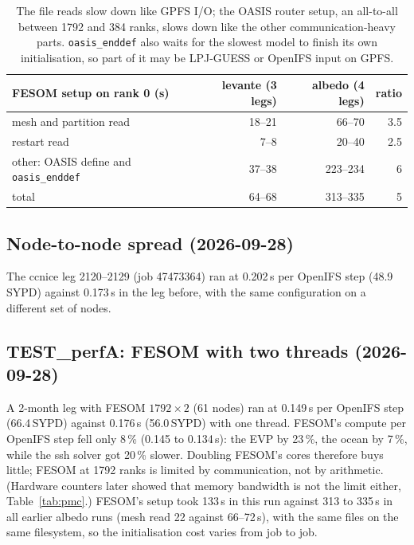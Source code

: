 \documentclass[11pt,a4paper]{article}
\begin{document}
\begin{table}[H]\centering\small
\begin{tabular}{lrrr}\toprule
FESOM setup on rank 0 (s) & levante (3 legs) & albedo (4 legs) & ratio\\\midrule
mesh and partition read & 18--21 & 66--70 & 3.5\\
restart read & 7--8 & 20--40 & 2.5\\
other: OASIS define and \texttt{oasis\_enddef} & 37--38 & 223--234 & 6\\
total & 64--68 & 313--335 & 5\\\bottomrule
\end{tabular}
\caption{The file reads slow down like GPFS I/O; the OASIS router setup, an all-to-all between 1792 and 384 ranks, slows down like the other communication-heavy parts. \texttt{oasis\_enddef} also waits for the slowest model to finish its own initialisation, so part of it may be LPJ-GUESS or OpenIFS input on GPFS.}
\end{table}

\subsection{Node-to-node spread (2026-09-28)}
The ccnice leg 2120--2129 (job 47473364) ran at 0.202\,s per OpenIFS step (48.9\,SYPD) against 0.173\,s in the leg before, with the same configuration on a different set of nodes.


\subsection{TEST\_perfA: FESOM with two threads (2026-09-28)}
A 2-month leg with FESOM $1792\times2$ (61 nodes) ran at 0.149\,s per OpenIFS step (66.4\,SYPD) against 0.176\,s (56.0\,SYPD) with one thread. FESOM's compute per OpenIFS step fell only 8\,\% (0.145 to 0.134\,s): the EVP by 23\,\%, the ocean by 7\,\%, while the ssh solver got 20\,\% slower. Doubling FESOM's cores therefore buys little; FESOM at 1792 ranks is limited by communication, not by arithmetic. (Hardware counters later showed that memory bandwidth is not the limit either, Table~\ref{tab:pmc}.) FESOM's setup took 133\,s in this run against 313 to 335\,s in all earlier albedo runs (mesh read 22 against 66--72\,s), with the same files on the same filesystem, so the initialisation cost varies from job to job.
\end{document}
